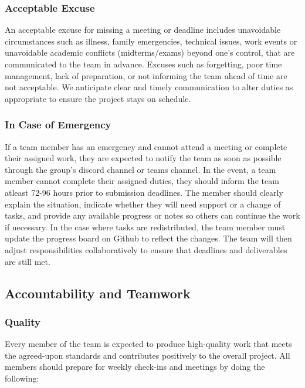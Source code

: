 \documentclass{article}
\begin{document}
\begin{enumerate}
\subsubsection*{Acceptable Excuse}

An acceptable excuse for missing a meeting or deadline includes unavoidable circumstances 
such as illness, family emergencies, technical issues, work events or unavoidable academic conflicts (midterms/exams) beyond one’s control,
that are communicated to the team in advance.
Excuses such as forgetting, poor time management, lack of preparation, or not informing the team
ahead of time are not acceptable. We anticipate clear and timely communication to alter duties as
appropriate to ensure the project stays on schedule. 

\subsubsection*{In Case of Emergency}

If a team member has an emergency and cannot attend a meeting or complete their assigned work, they 
are expected to notify the team as soon as possible through the group’s discord channel or teams channel. In the event, 
a team member cannot complete their assigned duties, they should inform the team atleast 72-96 hours prior to submission deadlines.
The member should clearly explain the situation, indicate whether they will need support or a change 
of tasks, and provide any available progress or notes so others can continue the work if necessary. In the case where tasks are redistributed,
the team member must update the progress board on Github to reflect the changes. 
The team will then adjust responsibilities collaboratively to ensure that deadlines and deliverables are still met.

\subsection*{Accountability and Teamwork}

\subsubsection*{Quality} 

Every member of the team is expected to produce high-quality work that meets the agreed-upon standards and contributes positively to the 
overall project. All members should prepare for weekly check-ins and meetings by doing the
following:


\end{enumerate}
\end{document}

